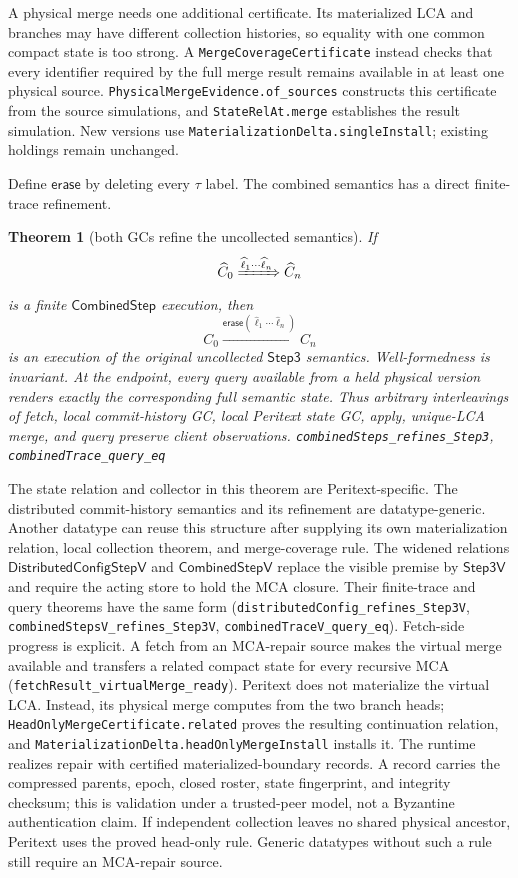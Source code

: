 \documentclass[11pt]{article}
\newtheorem{theorem}{Theorem}[section]
\newcommand{\lean}[1]{\texttt{#1}}
\begin{document}
A physical merge needs one additional certificate.  Its materialized LCA and
branches may have different collection histories, so equality with one common
compact state is too strong.  A \lean{MergeCoverageCertificate} instead checks
that every identifier required by the full merge result remains available in
at least one physical source.  \lean{PhysicalMergeEvidence.of\_sources}
constructs this certificate from the source simulations, and
\lean{StateRelAt.merge} establishes the result simulation.  New versions use
\lean{MaterializationDelta.singleInstall}; existing holdings remain unchanged.

Define $\mathsf{erase}$ by deleting every $\tau$ label.  The combined semantics
has a direct finite-trace refinement.

\begin{theorem}[both GCs refine the uncollected semantics]
\label{thm:combinedgc}
If
\[
  \widehat C_0 \xRightarrow{\widehat\ell_1\cdots\widehat\ell_n}
  \widehat C_n
\]
is a finite $\mathsf{CombinedStep}$ execution, then
\[
  C_0 \xrightarrow{\mathsf{erase}(\widehat\ell_1\cdots
  \widehat\ell_n)} C_n
\]
is an execution of the original uncollected $\mathsf{Step3}$ semantics.
Well-formedness is invariant.  At the endpoint, every query available from a
held physical version renders exactly the corresponding full semantic state.
Thus arbitrary interleavings of fetch, local commit-history GC, local Peritext
state GC, apply, unique-LCA merge, and query preserve client observations.
\hfill\lean{combinedSteps\_refines\_Step3},
\lean{combinedTrace\_query\_eq}
\end{theorem}

The state relation and collector in this theorem are Peritext-specific.  The
distributed commit-history semantics and its refinement are datatype-generic.
Another datatype can reuse this structure after supplying its own
materialization relation, local collection theorem, and merge-coverage rule.
The widened relations $\mathsf{DistributedConfigStepV}$ and
$\mathsf{CombinedStepV}$ replace the visible premise by $\mathsf{Step3V}$ and
require the acting store to hold the MCA closure.  Their finite-trace and query
theorems have the same form
(\lean{distributedConfig\_refines\_Step3V},
\lean{combinedStepsV\_refines\_Step3V},
\lean{combinedTraceV\_query\_eq}).  Fetch-side progress is explicit.  A fetch
from an MCA-repair source makes the virtual merge available and transfers a
related compact state for every recursive MCA
(\lean{fetchResult\_virtualMerge\_ready}).  Peritext does not materialize the
virtual LCA.  Instead, its physical merge computes from the two branch heads;
\lean{HeadOnlyMergeCertificate.related} proves the resulting continuation
relation, and \lean{MaterializationDelta.headOnlyMergeInstall} installs it.
The runtime realizes repair with certified materialized-boundary records.  A
record carries the compressed parents, epoch, closed roster, state fingerprint,
and integrity checksum; this is validation under a trusted-peer model, not a
Byzantine authentication claim.  If independent collection leaves no shared
physical ancestor, Peritext uses the proved head-only rule.  Generic datatypes
without such a rule still require an MCA-repair source.
\end{document}
